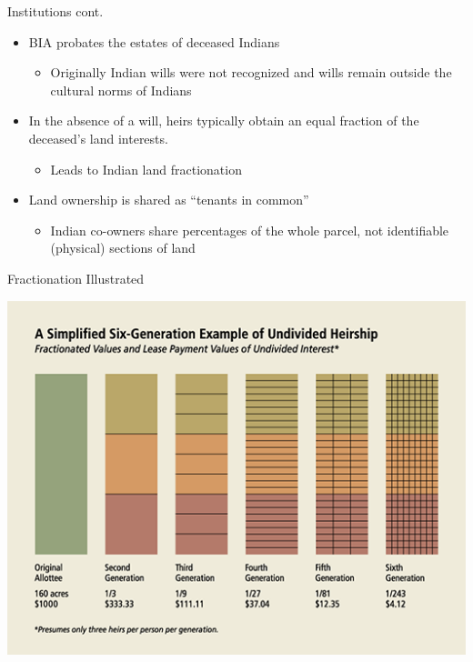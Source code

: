 \documentclass[ignorenonframetext,]{beamer}
\begin{document}
\begin{frame}{Institutions cont.}

\begin{itemize}
\itemsep1pt\parskip0pt
\item
  BIA probates the estates of deceased Indians

  \begin{itemize}
  \itemsep1pt\parskip0pt
  \item
    Originally Indian wills were not recognized and wills remain outside
    the cultural norms of Indians
  \end{itemize}
\item
  In the absence of a will, heirs typically obtain an equal fraction of
  the deceased's land interests.

  \begin{itemize}
  \itemsep1pt\parskip0pt
  \item
    Leads to Indian land fractionation
  \end{itemize}
\item
  Land ownership is shared as ``tenants in common''

  \begin{itemize}
  \itemsep1pt\parskip0pt
  \item
    Indian co-owners share percentages of the whole parcel, not
    identifiable (physical) sections of land
  \end{itemize}
\end{itemize}

\end{frame}

\begin{frame}{Fractionation Illustrated}

\centering
\includegraphics{heirship-new-opt.png}

\end{frame}
\end{document}
